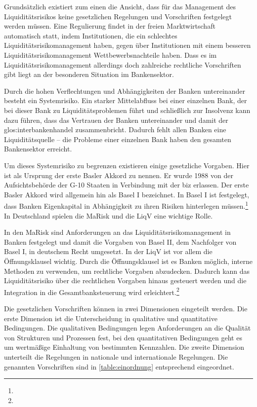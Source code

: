 \begin{onehalfspacing}
Grundsätzlich existiert zum einen die Ansicht, dass für das Management des Liquiditätsrisikos keine gesetzlichen Regelungen und Vorschriften festgelegt werden müssen. Eine Regulierung findet in der freien Marktwirtschaft automatisch statt, indem Institutionen, die ein schlechtes Liquiditätsrisikomanagement haben, gegen über Institutionen mit einem besseren Liquiditätsrisikomanagement Wettbewerbsnachteile haben. Dass es im Liquiditätsrisikomanagement allerdings doch zahlreiche rechtliche Vorschriften gibt liegt an der besonderen Situation im Bankensektor.

Durch die hohen Verflechtungen und Abhängigkeiten der Banken untereinander besteht ein Systemrisiko. Ein starker Mittelabfluss bei einer einzelnen Bank, der bei dieser Bank zu Liquiditätsproblemen führt und schließlich zur Insolvenz kann dazu führen, dass das Vertrauen der Banken untereinander und damit der \gls{glos:interbankenhandel} zusammenbricht. Dadurch fehlt allen Banken eine Liquiditätsquelle -- die Probleme einer einzelnen Bank haben den gesamten Bankensektor erreicht.

Um dieses Systemrisiko zu begrenzen existieren einige gesetzliche Vorgaben. Hier ist als Ursprung der erste Basler Akkord zu nennen. Er wurde 1988 von der Aufsichtsbehörde der G-10 Staaten in Verbindung mit der \gls{biz} erlassen. Der erste Basler Akkord wird allgemein hin als Basel I bezeichnet. In Basel I ist festgelegt, dass Banken Eigenkapital in Abhängigkeit zu ihren Risiken hinterlegen müssen.\footnote{ } In Deutschland spielen die \gls{MaRisk} und die \gls{LiqV} eine wichtige Rolle.

In den \gls{MaRisk} sind Anforderungen an das Liquiditätsrisikomanagement in Banken festgelegt und damit die Vorgaben von Basel II, dem Nachfolger von Basel I, in deutschem Recht umgesetzt. In der \gls{LiqV} ist vor allem die Öffnungsklausel wichtig. Durch die Öffnungsklausel ist es Banken möglich, interne Methoden zu verwenden, um rechtliche Vorgaben abzudecken. Dadurch kann das Liquiditätsrisiko über die rechtlichen Vorgaben hinaus gesteuert werden und die Integration in die Gesamtbanksteuerung wird erleichtert.\footnote{ }

Die gesetzlichen Vorschriften können in zwei Dimensionen eingeteilt werden. Die erste Dimension ist die Unterscheidung in qualitative und quantitative Bedingungen. Die qualitativen Bedingungen legen Anforderungen an die Qualität von Strukturen und Prozessen fest, bei den quantitativen Bedingungen geht es um wertmäßige Einhaltung von bestimmten Kennzahlen. Die zweite Dimension unterteilt die Regelungen in nationale und internationale Regelungen. Die genannten Vorschriften sind in \vref{table:einordnung} entsprechend eingeordnet.


\end{onehalfspacing}
